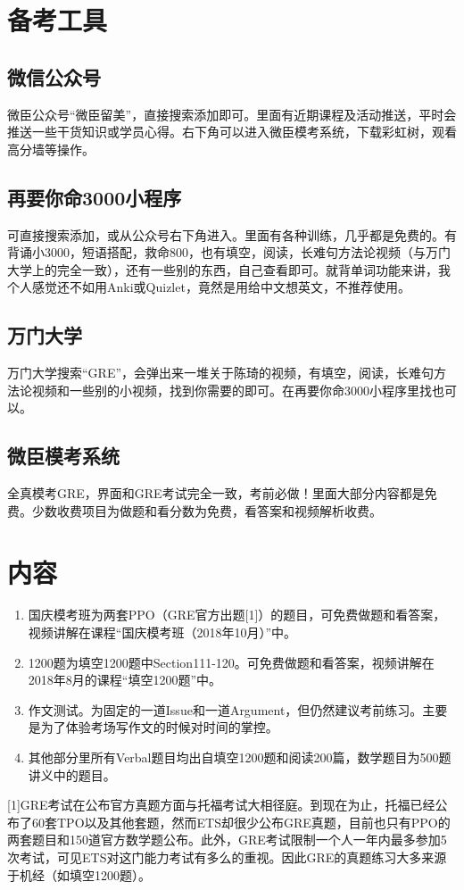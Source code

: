 \documentclass[11pt,a4paper]{article}
\begin{document}
	\section{备考工具}{
	
	\subsection{微信公众号}微臣公众号“微臣留美”，直接搜索添加即可。里面有近期课程及活动推送，平时会推送一些干货知识或学员心得。右下角可以进入微臣模考系统，下载彩虹树，观看高分墙等操作。
	
	\subsection{再要你命3000小程序}可直接搜索添加，或从公众号右下角进入。里面有各种训练，几乎都是免费的。有背诵小3000，短语搭配，救命800，也有填空，阅读，长难句方法论视频（与万门大学上的完全一致），还有一些别的东西，自己查看即可。就背单词功能来讲，我个人感觉还不如用Anki或Quizlet，竟然是用给中文想英文，不推荐使用。
	
	\subsection{万门大学}万门大学搜索“GRE”，会弹出来一堆关于陈琦的视频，有填空，阅读，长难句方法论视频和一些别的小视频，找到你需要的即可。在再要你命3000小程序里找也可以。
	
	\subsection{微臣模考系统}全真模考GRE，界面和GRE考试完全一致，考前必做！里面大部分内容都是免费。少数收费项目为做题和看分数为免费，看答案和视频解析收费。
	
	\section*{内容}
	\begin{enumerate}
		\item 国庆模考班为两套PPO（GRE官方出题[1]）的题目，可免费做题和看答案，视频讲解在课程“国庆模考班（2018年10月）”中。
		\item 1200题为填空1200题中Section111-120。可免费做题和看答案，视频讲解在2018年8月的课程“填空1200题”中。
		\item 作文测试。为固定的一道Issue和一道Argument，但仍然建议考前练习。主要是为了体验考场写作文的时候对时间的掌控。
		\item 其他部分里所有Verbal题目均出自填空1200题和阅读200篇，数学题目为500题讲义中的题目。
	\end{enumerate}

	
	\vspace{0pt}
	[1]GRE考试在公布官方真题方面与托福考试大相径庭。到现在为止，托福已经公布了60套TPO以及其他套题，然而ETS却很少公布GRE真题，目前也只有PPO的两套题目和150道官方数学题公布。此外，GRE考试限制一个人一年内最多参加5次考试，可见ETS对这门能力考试有多么的重视。因此GRE的真题练习大多来源于机经（如填空1200题）。
}
	
\end{document}
